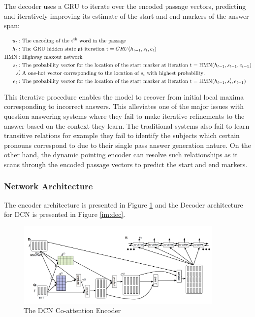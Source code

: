 The decoder uses a GRU to iterate over the encoded passage vectors, predicting and iteratively improving its estimate of the start and end markers of the answer span:

\begin{align*}
u_t: &\text{ The encoding of the t\textsuperscript{th} word in the passage} \\
h_t: &\text{ The GRU hidden state at iteration t} = GRU(h_{t - 1}, s_t, e_t) \\
\text{HMN}: &\text{ Highway maxout network} \\
s_t: &\text{ The probability vector for the location of the start marker at iteration t} = \text{HMN}(h_{t - 1}, s_{t - 1}, e_{t - 1}) \\
s_t' &\text{ A one-hot vector corresponding to the location of } s_t \text{ with highest probability}. \\
e_t: &\text{ The probability vector for the location of the start marker at iteration t} = \text{HMN}(h_{t - 1}, s_t', e_{t - 1})\\
\end{align*}

This iterative procedure enables the model to recover from initial local maxima corresponding to incorrect answers. This alleviates one of the major issues with question answering systems where they fail to make iterative refinements to the answer based on the context they learn. The traditional systems also fail to learn transitive relations for example they fail to identify the subjects which certain pronouns correspond to due to their single pass answer generation nature. On the other hand, the dynamic pointing encoder can resolve such relationships as it scans through the encoded passage vectors to predict the start and end markers.\\

\subsubsection{Network Architecture}
The encoder architecture is presented in Figure \ref{im:enc} and the Decoder architecture for DCN is presented in Figure \ref{im:dec}.

\begin{figure}[h]
    \centering
    \includegraphics[width=0.9\textwidth]{images/coattn_encoder.png}
    \caption{The DCN Co-attention Encoder}
    \label{im:enc}
\end{figure}

